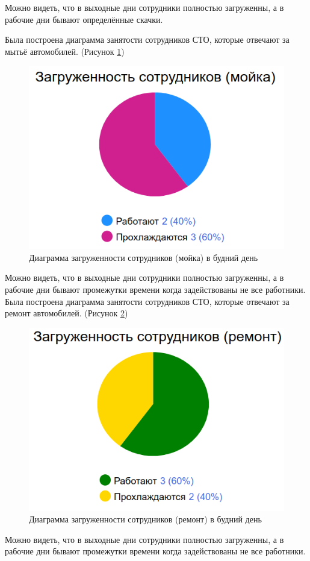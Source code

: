 \documentclass[14pt,fleqn]{extarticle}
\begin{document}
	Можно видеть, что в выходные дни сотрудники полностью загруженны, а в рабочие дни бывают определённые скачки.
	
	Была построена диаграмма занятости сотрудников СТО, которые отвечают за мытьё автомобилей. (Рисунок \ref{fig:carwashing_anylogic_washing_workers})
	
	\begin{figure}[h]
		\centering \includegraphics[scale=0.5]{carwashing_anylogic_washing_workers}
		\caption{Диаграмма загруженности сотрудников (мойка) в будний день}
		\label{fig:carwashing_anylogic_washing_workers}
	\end{figure}
	
	Можно видеть, что в выходные дни сотрудники полностью загруженны, а в рабочие дни бывают промежутки времени когда задействованы не все работники.\\
	
	Была построена диаграмма занятости сотрудников СТО, которые отвечают за ремонт автомобилей. (Рисунок \ref{fig:carwashing_anylogic_repair_workers})
	
	\begin{figure}[h]
		\centering \includegraphics[scale=0.5]{carwashing_anylogic_repair_workers}
		\caption{Диаграмма загруженности сотрудников (ремонт) в будний день}
		\label{fig:carwashing_anylogic_repair_workers}
	\end{figure}
	
	Можно видеть, что в выходные дни сотрудники полностью загруженны, а в рабочие дни бывают промежутки времени когда задействованы не все работники.
\end{document}
